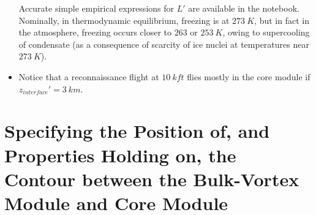 \documentclass[preprint, prX]{revtex4}
\newcommand{\zinter}{z_{interface}}
\begin{document}
\begin{itemize}
Accurate simple empirical expressions for $L'$ are available in the notebook. Nominally, in thermodynamic equilibrium, freezing is at $273\ \si{K}$, but in fact in the atmosphere, freezing occurs closer to $263$ or $253\ \si{K}$, owing to supercooling of condensate (as a consequence of scarcity of ice nuclei at temperatures near $273\ \si{K}$).

\item Notice that a reconnaissance flight at $10\ \si{kft}$ flies mostly in the core module if $\zinter' = 3\ \si{km}$.

\end{itemize}

\section{Specifying the Position of, and Properties Holding on, the Contour between the Bulk-Vortex Module and Core Module}

\begin{figure}[h!]
	\centering
	\def\svgwidth{0.7\columnwidth}
	
\end{figure}
\end{document}
